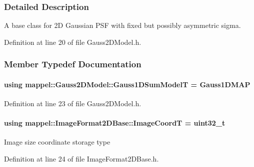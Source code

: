 \subsubsection{Detailed Description}
A base class for 2D Gaussian P\+SF with fixed but possibly asymmetric sigma. 



Definition at line 20 of file Gauss2\+D\+Model.\+h.



\subsubsection{Member Typedef Documentation}
\paragraph[{\texorpdfstring{Gauss1\+D\+Sum\+ModelT}{Gauss1DSumModelT}}]{\setlength{\rightskip}{0pt plus 5cm}using {\bf mappel\+::\+Gauss2\+D\+Model\+::\+Gauss1\+D\+Sum\+ModelT} =  {\bf Gauss1\+D\+M\+AP}}\hypertarget{classmappel_1_1Gauss2DModel_a6e41ec1749814a91648caf394edd4385}{}\label{classmappel_1_1Gauss2DModel_a6e41ec1749814a91648caf394edd4385}


Definition at line 23 of file Gauss2\+D\+Model.\+h.

\paragraph[{\texorpdfstring{Image\+CoordT}{ImageCoordT}}]{\setlength{\rightskip}{0pt plus 5cm}using {\bf mappel\+::\+Image\+Format2\+D\+Base\+::\+Image\+CoordT} =  uint32\+\_\+t\hspace{0.3cm}{\ttfamily [inherited]}}\hypertarget{classmappel_1_1ImageFormat2DBase_a45e9234d63c357f34ca56c72c12b9e9c}{}\label{classmappel_1_1ImageFormat2DBase_a45e9234d63c357f34ca56c72c12b9e9c}
Image size coordinate storage type 

Definition at line 24 of file Image\+Format2\+D\+Base.\+h.

